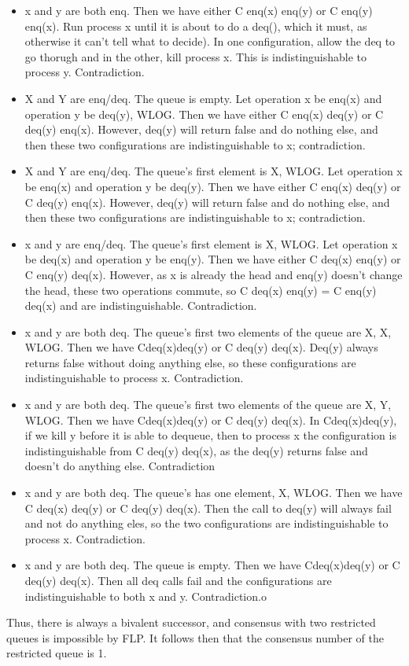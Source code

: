 \documentclass{article}
\begin{document}
\begin{itemize}
\item x and y are both enq.  Then we have either C enq(x) enq(y) or C enq(y) enq(x). Run process x until it is about to do a deq(), which it must, as otherwise it can't tell what to decide). In one configuration, allow the deq to go thorugh and in the other, kill process x. This is indistinguishable to process y. Contradiction.
\item X and Y are enq/deq. The queue is empty. Let operation x be enq(x) and operation y be deq(y), WLOG. Then we have either C enq(x) deq(y) or C deq(y) enq(x). However, deq(y) will return false and do nothing else, and then these two configurations are indistinguishable to x; contradiction.
\item X and Y are enq/deq. The queue's first element is X, WLOG. Let operation x be enq(x) and operation y be deq(y). Then we have either C enq(x) deq(y) or C deq(y) enq(x). However, deq(y) will return false and do nothing else, and then these two configurations are indistinguishable to x; contradiction.
\item x and y are enq/deq. The queue's first element is X, WLOG. Let operation x be deq(x) and operation y be enq(y). Then we have either C deq(x) enq(y) or C enq(y) deq(x). However, as x is already the head and enq(y) doesn't change the head, these two operations commute, so C deq(x) enq(y) = C enq(y) deq(x) and are indistinguishable. Contradiction.
\item x and y are both deq. The queue's first two elements of the queue are X, X, WLOG. Then we have Cdeq(x)deq(y) or C deq(y) deq(x). Deq(y) always returns false without doing anything else, so these configurations are indistinguishable to process x. Contradiction.
\item x and y are both deq. The queue's first two elements of the queue are X, Y, WLOG. Then we have Cdeq(x)deq(y) or C deq(y) deq(x). In Cdeq(x)deq(y), if we kill y before it is able to dequeue, then to process x the configuration is indistinguishable from C deq(y) deq(x), as the deq(y) returns false and doesn't do anything else. Contradiction
\item x and y are both deq. The queue's has one element, X, WLOG. Then we have C deq(x) deq(y) or C deq(y) deq(x). Then the call to deq(y) will always fail and not do anything eles, so the two configurations are indistinguishable to process x. Contradiction.
\item x and y are both deq. The queue is empty. Then we have Cdeq(x)deq(y) or C deq(y) deq(x). Then all deq calls fail and the configurations are indistinguishable to both x and y. Contradiction.o
\end{itemize}
Thus, there is always a bivalent successor, and consensus with two restricted queues is impossible by FLP. It follows then that the consensus number of the restricted queue is 1.
\end{document}
